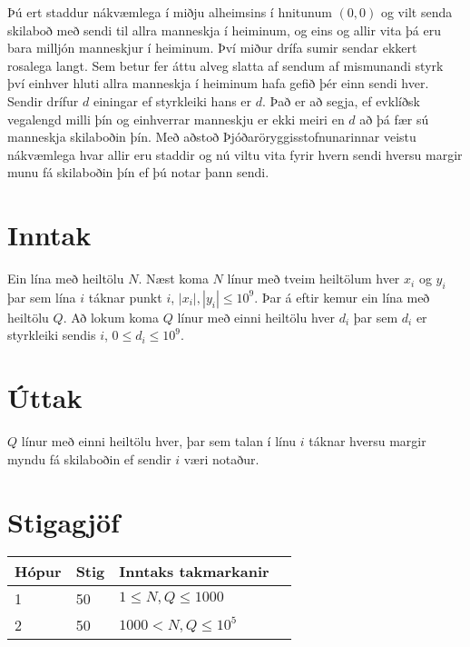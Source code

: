 Þú ert staddur nákvæmlega í miðju alheimsins í hnitunum $(0,0)$ og vilt senda skilaboð með sendi til allra manneskja í heiminum, og eins og allir vita þá eru bara milljón manneskjur í heiminum.
Því miður drífa sumir sendar ekkert rosalega langt. 
Sem betur fer áttu alveg slatta af sendum af mismunandi styrk því einhver hluti allra manneskja í heiminum hafa gefið þér einn sendi hver.
Sendir drífur $d$ einingar ef styrkleiki hans er $d$. Það er að segja, ef evklíðsk vegalengd milli þín og einhverrar manneskju er ekki meiri en $d$ að þá fær sú manneskja skilaboðin þín. Með aðstoð Þjóðaröryggisstofnunarinnar veistu nákvæmlega hvar allir eru staddir og nú viltu vita fyrir hvern sendi hversu margir munu fá skilaboðin þín ef þú notar þann sendi.
\section*{Inntak}
Ein lína með heiltölu $N$. Næst koma $N$ línur með tveim heiltölum hver $x_i$ og $y_i$ þar sem lína $i$ táknar punkt $i$, $|x_i| , |y_i| \leq 10^9$. Þar á eftir kemur ein lína með heiltölu $Q$. Að lokum koma $Q$ línur með einni heiltölu hver $d_i$ þar sem $d_i$ er styrkleiki sendis $i$, $0 \leq d_i \leq 10^9$.
\section*{Úttak}
$Q$ línur með einni heiltölu hver, þar sem talan í línu $i$ táknar hversu margir myndu fá skilaboðin ef sendir $i$ væri notaður.

\section*{Stigagjöf}
\begin{tabular}{|l|l|l|l|}
\hline
Hópur & Stig & Inntaks takmarkanir \\ \hline
    1 & 50     & $1 \leq N, Q \leq 1000$ \\ \hline
    2 & 50     & $1000 < N, Q \leq 10^5$ \\ \hline
\end{tabular}
